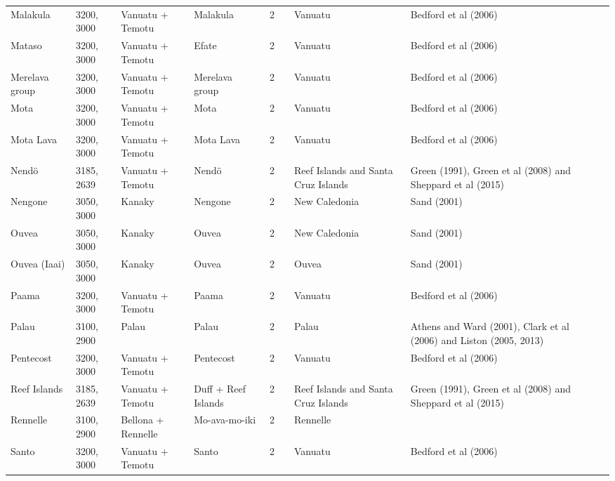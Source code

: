 \begin{longtable}{p{2cm}p{2cm}p{2cm}p{2cm}p{2cm}p{2cm}p{2cm}p{2cm}p{2cm}}
  Malakula & 3200, 3000 & Vanuatu + Temotu & Malakula & 2 &  & Vanuatu & Bedford et al (2006) & \citet{rieth_cochrane_2018} \\ 
  Mataso & 3200, 3000 & Vanuatu + Temotu & Efate & 2 &  & Vanuatu & Bedford et al (2006) & \citet{rieth_cochrane_2018} \\ 
  Merelava group & 3200, 3000 & Vanuatu + Temotu & Merelava group & 2 &  & Vanuatu & Bedford et al (2006) & \citet{rieth_cochrane_2018} \\ 
  Mota & 3200, 3000 & Vanuatu + Temotu & Mota & 2 &  & Vanuatu & Bedford et al (2006) & \citet{rieth_cochrane_2018} \\ 
  Mota Lava & 3200, 3000 & Vanuatu + Temotu & Mota Lava & 2 &  & Vanuatu & Bedford et al (2006) & \citet{rieth_cochrane_2018} \\ 
  Nendö & 3185, 2639 & Vanuatu + Temotu & Nendö & 2 &  & Reef Islands and Santa Cruz Islands & Green (1991), Green et al (2008) and Sheppard et al (2015) & \citet{rieth_cochrane_2018} \\ 
  Nengone & 3050, 3000 & Kanaky & Nengone & 2 &  & New Caledonia & Sand (2001) & \citet{rieth_cochrane_2018} \\ 
  Ouvea & 3050, 3000 & Kanaky & Ouvea & 2 &  & New Caledonia & Sand (2001) & \citet{rieth_cochrane_2018} \\ 
  Ouvea (Iaai) & 3050, 3000 & Kanaky & Ouvea & 2 &  & Ouvea & Sand (2001) & \citet{rieth_cochrane_2018} \\ 
  Paama & 3200, 3000 & Vanuatu + Temotu & Paama & 2 &  & Vanuatu & Bedford et al (2006) & \citet{rieth_cochrane_2018} \\ 
  Palau & 3100, 2900 & Palau & Palau & 2 &  & Palau & Athens and Ward (2001), Clark et al (2006) and Liston (2005, 2013) & \citet{rieth_cochrane_2018} \\ 
  Pentecost & 3200, 3000 & Vanuatu + Temotu & Pentecost & 2 &  & Vanuatu & Bedford et al (2006) & \citet{rieth_cochrane_2018} \\ 
  Reef Islands & 3185, 2639 & Vanuatu + Temotu & Duff + Reef Islands & 2 &  & Reef Islands and Santa Cruz Islands & Green (1991), Green et al (2008) and Sheppard et al (2015) & \citet{rieth_cochrane_2018} \\ 
  Rennelle & 3100, 2900 & Bellona + Rennelle & Mo-ava-mo-iki & 2 &  & Rennelle & \citet{carson2012recent} &  \\ 
  Santo & 3200, 3000 & Vanuatu + Temotu & Santo & 2 &  & Vanuatu & Bedford et al (2006) & \citet{rieth_cochrane_2018} \\ 

\end{longtable}
